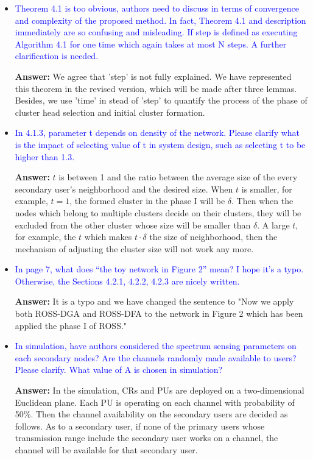 \documentclass[10pt,a4paper]{article}
\begin{document}
\begin{itemize}
\item \textcolor{blue}{  Theorem 4.1 is too obvious, authors need to discuss in terms of convergence and complexity of the proposed method. In fact, Theorem 4.1 and description immediately are so confusing and misleading. If step is defined as executing Algorithm 4.1 for one time which again takes at most N steps. A further clarification is needed.}

\textbf{Answer:} We agree that 'step' is not fully explained.
	We have represented this theorem in the revised version, which will be made after three lemmas.
	Besides, we use 'time' in stead of 'step' to quantify the process of the phase of cluster head selection and initial cluster formation.
	
	
\item \textcolor{blue}{  In 4.1.3, parameter t depends on density of the network. Please clarify what is the impact of selecting value of t in system design, such as selecting t to be higher than 1.3.}

\textbf{Answer:}	$t$ is between 1 and the ratio between the average size of the every secondary user's neighborhood and the desired size.
	When $t$ is smaller, for example, $t=1$, the formed cluster in the phase I will be $\delta$.
	Then when the nodes which belong to multiple clusters decide on their clusters, they will be excluded from the other cluster whose size will be smaller than $\delta$.
	A large $t$, for example, the $t$ which makes $t\cdot\delta$ the size of neighborhood, then the mechanism of adjusting the cluster size will not work any more.

    
\item \textcolor{blue}{  In page 7, what does “the toy network in Figure 2” mean? I hope it’s a typo. Otherwise, the Sections 4.2.1, 4.2.2, 4.2.3 are nicely written.}

\textbf{Answer:} It is a typo and we have changed the sentence to "Now we apply both ROSS-DGA and ROSS-DFA to the network in Figure 2 which has been applied the phase I of ROSS."
    
\item \textcolor{blue}{  In simulation, have authors considered the spectrum sensing parameters on each secondary nodes? Are the channels randomly made available to users? Please clarify. What value of A is chosen in simulation?}

\textbf{Answer:} In the simulation, CRs and PUs are deployed on a two-dimensional Euclidean plane. 
Each PU is operating on each channel with probability of 50\%.
Then the channel availability on the secondary users are decided as follows.
As to a secondary user, if none of the primary users whose transmission range include the secondary user works on a channel, the channel will be available for that secondary user. 


\end{itemize}
\end{document}

